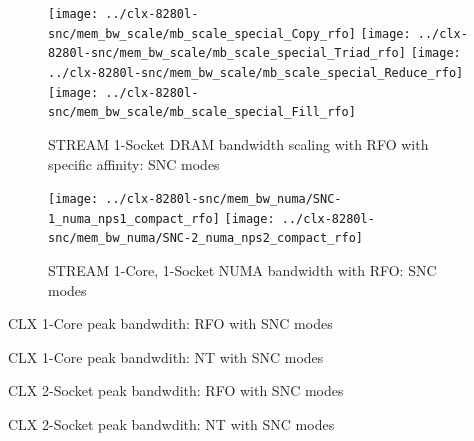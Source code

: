 \documentclass{article}
\begin{document}
\begin{figure}[!hb]
    \centering
    \texttt{[image: ../clx-8280l-snc/mem\_bw\_scale/mb\_scale\_special\_Copy\_rfo]}
    \texttt{[image: ../clx-8280l-snc/mem\_bw\_scale/mb\_scale\_special\_Triad\_rfo]}
    \texttt{[image: ../clx-8280l-snc/mem\_bw\_scale/mb\_scale\_special\_Reduce\_rfo]}
    \texttt{[image: ../clx-8280l-snc/mem\_bw\_scale/mb\_scale\_special\_Fill\_rfo]}
    \caption{STREAM 1-Socket DRAM bandwidth scaling with RFO with specific affinity: SNC modes}
    \label{figure:mem_bw_scale_special_rfo_clx_snc}
\end{figure}

\begin{figure}[!hb]
    \centering
    \texttt{[image: ../clx-8280l-snc/mem\_bw\_numa/SNC-1\_numa\_nps1\_compact\_rfo]}
    \texttt{[image: ../clx-8280l-snc/mem\_bw\_numa/SNC-2\_numa\_nps2\_compact\_rfo]}
    \caption{STREAM 1-Core, 1-Socket NUMA bandwidth with RFO: SNC modes}
    \label{figure:mem_bw_numa_rfo_clx_snc}
\end{figure}

\begin{table}[!hb]
\centering

\caption{CLX 1-Core peak bandwdith: RFO with SNC modes}
\label{table:mem_bw_core_rfo_clx_snc}
\end{table}
\begin{table}[!hb]
\centering

\caption{CLX 1-Core peak bandwdith: NT with SNC modes}
\label{table:mem_bw_core_nt_clx_snc}
\end{table}
\begin{table}[!hb]
\centering

\caption{CLX 2-Socket peak bandwdith: RFO with SNC modes}
\label{table:mem_bw_node_rfo_clx_snc}
\end{table}
\begin{table}[!hb]
\centering

\caption{CLX 2-Socket peak bandwdith: NT with SNC modes}
\label{table:mem_bw_node_nt_clx_snc}
\end{table}


\clearpage
\end{document}
